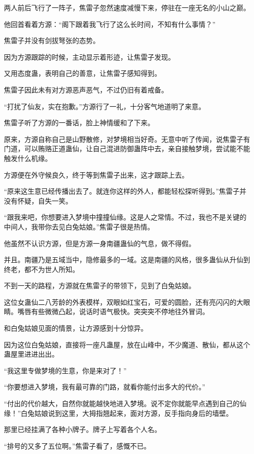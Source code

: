 \begin{this_body}
两人前后飞行了一阵子，焦雷子忽然速度减慢下来，停驻在一座无名的小山之巅。

他回首看着方源：“阁下跟着我飞行了这么长时间，不知有什么事情？”

焦雷子并没有剑拔弩张的态势。

因为方源跟踪的时候，主动显示着形迹，让焦雷子发现。

又用态度蛊，表明自己的善意，让焦雷子感知得到。

焦雷子因此未有对方源恶声恶气，不过仍旧有着戒备。

“打扰了仙友，实在抱歉。”方源行了一礼，十分客气地道明了来意。

焦雷子听了方源的一番话，脸上神情缓和了下来。

原来，方源自称自己是山野散修，对梦境相当好奇。无意中听了传闻，说焦雷子有门道，可以贿赂正道蛊仙，让自己混进防御蛊阵中去，亲自接触梦境，尝试能不能触发什么机缘。

方源便在外守候良久，终于等到焦雷子出来，这才跟踪上去。

“原来这生意已经传播出去了。就连你这样的外人，都能轻松探听得到。”焦雷子并没有怀疑，自失一笑。

“跟我来吧，你想要进入梦境中撞撞仙缘。这是人之常情。不过，我也不是关键的中间人，我带你去见白兔姑娘。”焦雷子很是热情。

他虽然不认识方源，但是方源一身南疆蛊仙的气息，做不得假。

并且。南疆乃是五域当中，隐修最多的一域。这是南疆的风格，很多蛊仙从升仙到终老，都不为世人所知。

不到一天的路程，方源就在焦雷子的带领下，见到了白兔姑娘。

这位女蛊仙二八芳龄的外表模样，双眼如红宝石，可爱的圆脸，还有亮闪闪的大眼睛。嘴唇有些微微凸起，说话时语气极快。突突突不停地往外冒词。

和白兔姑娘见面的情景，让方源感到十分惊异。

因为这位白兔姑娘，直接将一座凡蛊屋，放在山峰中，不少魔道、散仙，都从这个蛊屋里进进出出。

“我这里专做梦境的生意，你是来对了！”

“你要想进入梦境，我有最可靠的门路，就看你能付出多大的代价。”

“付出的代价越大，自然你就能越快地进入梦境。说不定你就能早点遇到自己的仙缘！”白兔姑娘说到这里，大拇指翘起来，面对方源，反手指向身后的墙壁。

那里已经挂满了各种小牌子。牌子上写着各个人名。

“排号的又多了五位啊。”焦雷子看了，感慨不已。


\end{this_body}
